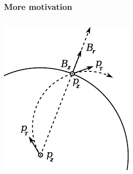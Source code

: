 \documentclass[compress]{beamer}
\begin{document}
\begin{frame}
\frametitle{More motivation}

\begin{columns}
\hfill \includegraphics[width=0.6\linewidth]{bfield_components.pdf}


\end{columns}
\end{frame}
\end{document}
